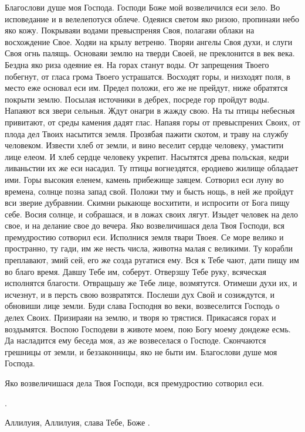 \begin{mymulticols}
Благослови душе моя Господа. Господи Боже мой возвеличился еси зело. Во исповедание и в велелепотуся облече. Одеяися светом яко ризою, пропинаяи небо яко кожу. Покрываяи водами превыспреняя Своя, полагаяи облаки на восхождение Свое. Ходяи на крылу ветреню. Творяи ангелы Своя духи, и слуги Своя огнь палящь. Основаяи землю на тверди Своей, не преклонится в век века. Бездна яко риза одеяние ея. На горах станут воды. От запрещения Твоего побегнут, от гласа грома Твоего устрашатся. Восходят горы, и низходят поля, в место еже основал еси им. Предел положи, его же не прейдут, ниже обратятся покрыти землю. Посылая источники в дебрех, посреде гор пройдут воды. Напаяют вся звери сельныя. Ждут онагри в жажду свою. На ты птицы небесныя привитают, от среды камения дадят глас. Напаяя горы от превыспрених Своих, от плода дел Твоих насытится земля. Прозябая пажити скотом, и траву на службу человеком. Извести хлеб от земли, и вино веселит сердце человеку, умастити лице елеом. И хлеб сердце человеку укрепит. Насытятся древа польская, кедри ливаньстии их же еси насадил. Ту птицы вогнездятся, еродиево жилище обладает ими. Горы высокия еленем, камень прибежище заяцем. Сотворил еси луну во времена, солнце позна запад свой. Положи тму и бысть нощь, в ней же пройдут вси зверие дубравнии. Скимни рыкающе восхитити, и испросити от Бога пищу себе. Восия солнце, и собрашася, и в ложах своих лягут. Изыдет человек на дело свое, и на делание свое до вечера. Яко возвеличишася дела Твоя Господи, вся премудростию сотворил еси. Исполнися земля твари Твоея. Се море велико и пространно, ту гади, им же несть числа, животна малая с великими. Ту корабли преплавают, змий сей, его же созда ругатися ему. Вся к Тебе чают, дати пищу им во благо время. Давшу Тебе им, соберут. Отверзшу Тебе руку, всяческая исполнятся благости. Отвращьшу же Тебе лице, возмятутся. Отимеши духи их, и исчезнут, и в персть свою возвратятся. Послеши дух Свой и созиждутся, и обновиши лице земли. Буди слава Господня во веки, возвеселится Господь о делех Своих. Призираяи на землю, и творя ю трястися. Прикасаяся горах и воздымятся. Воспою Господеви в животе моем, пою Богу моему дондеже есмь. Да насладится ему беседа моя, аз же возвеселася о Господе. Скончаются грешницы от земли, и беззаконницы, яко не быти им. Благослови душе моя Господа. 

 Яко возвеличишася дела Твоя Господи, вся премудростию сотворил еси. 

 .

Аллилуия, Аллилуия, слава Тебе, Боже .


\end{mymulticols}
